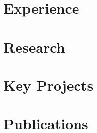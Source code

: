 \newcommand{\UCSDCourses}{Advanced Computer Vision, Reinforcement Learning Theory, Data Systems for Machine Learning, AI Agents}
\newcommand{\IITBCourses}{Computer Vision, Advanced Image Processing, Robotics, Convex Optimization, Numerical Analysis, Linear Algebra}
\newcommand{\SkillRows}{%
  \skill{Languages}{Python, \cpp, CUDA, Go, MATLAB}
  \skill{Frameworks \& Tools}{PyTorch, TensorFlow, ROS, OpenCV, Unreal Engine, Gaussian Splatting}
  \skill{AI-forward Development}{Loop engineering, harness optimization, Claude Code, Codex, Cursor, MCP, subagents}}
\newcommand{\secgap}{9pt}
\newcommand{\rulegap}{5.5pt}
\newcommand{\entrygap}{5pt}



\Header

\section{Experience}
\GleanVision
\Duality

\section{Research}
\HomeRobots
\Tomography

\section{Key Projects}
\InverseRendering

\Education

\section{Publications}
\PubRearrangement
\PubSaturation
\PubPermutation

\Skills

